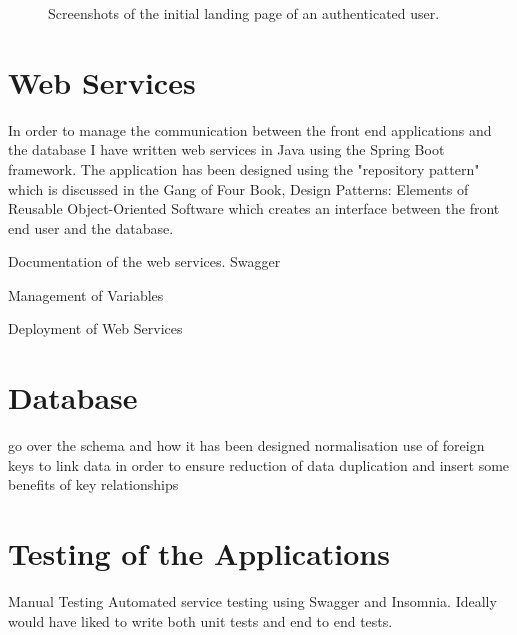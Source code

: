 \documentclass[a4paper,11pt]{report}
\begin{document}
\begin{figure}[H]
    \centering
    \caption{Screenshots of the initial landing page of an authenticated user.}
    \label{fig:WebUi}
\end{figure}

\section{Web Services}
In order to manage the communication between the front end applications and the database I have written web services in Java using the Spring Boot framework. 
The application has been designed using the "repository pattern" which is discussed in the Gang of Four Book, Design Patterns: Elements of Reusable Object-Oriented Software\cite{gamma1994design} which creates an interface between the front end user and the database.

Documentation of the web services.
Swagger

Management of Variables

Deployment of Web Services



\section{Database}
go over the schema and how it has been designed
normalisation
use of foreign keys to link data in order to ensure reduction of data duplication and insert some benefits of key relationships

\section{Testing of the Applications}
Manual Testing
Automated service testing using Swagger and Insomnia.
Ideally would have liked to write both unit tests and end to end tests.
\end{document}
